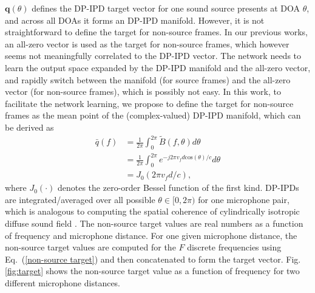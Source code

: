 \documentclass[lettersize,journal]{IEEEtran}
\begin{document}
$\mathbf{q}(\theta)$ defines the DP-IPD target vector for one sound source presents at  DOA $\theta$, and across all DOAs it forms an DP-IPD manifold. However, it is not straightforward to define the target for non-source frames. In our previous works, an all-zero vector is used as the target for non-source frames, which however seems not meaningfully correlated to the DP-IPD vector. The network needs to learn the output space expanded by the DP-IPD manifold and the all-zero vector, and rapidly switch between the manifold (for source frames) and the all-zero vector (for non-source frames), which is possibly not easy. In this work, to facilitate the network learning, we propose to define the target for non-source frames as the mean point of the (complex-valued) DP-IPD manifold, which can be derived as 
\begin{equation}\label{non-source target}
\begin{aligned}
\bar{q}(f)&= \frac{1}{2\pi}\int_{0}^{2\pi} \tilde{B}(f,\theta) d\theta   \\
&=\frac{1}{2\pi}\int_{0}^{2\pi} e^{-j 2\pi v_f d \text{cos}(\theta)/c} d\theta  \\
&= J_0\left(2\pi v_f d / c\right),
\end{aligned}
\end{equation}
where $J_0(\cdot)$ denotes the zero-order Bessel function of the first kind. DP-IPDs are integrated/averaged over all possible $\theta\in[0,2\pi)$ for one microphone pair, which is analogous to computing the spatial coherence of cylindrically isotropic diffuse sound field \cite{Habets2008GeneratingNM}. 
The non-source target values are real numbers as a function of frequency and microphone distance. For one given microphone distance, the non-source target values are computed for the $F$ discrete frequencies using Eq.~(\ref{non-source target}) and then concatenated to form the target vector. 
Fig. \ref{fig:target} shows the non-source target value as a function of frequency for two different microphone distances. 
\end{document}
